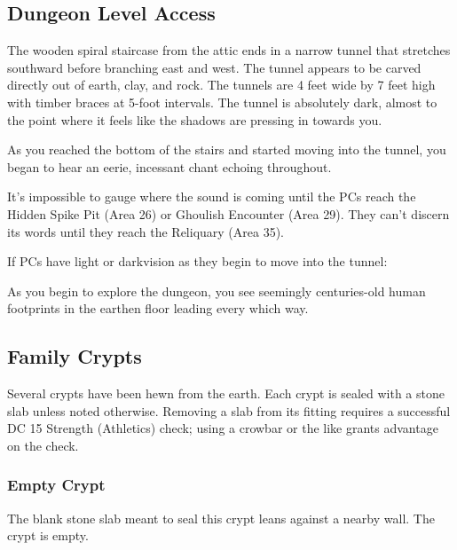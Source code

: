 \pagebreak
\subsection{Dungeon Level Access}
\label{sec:DungeonLevelAccess}
\begin{readout}
  The wooden spiral staircase from the attic ends in a narrow tunnel that stretches southward before branching 
  east and west. The tunnel appears to be carved directly out of earth, clay, and rock. The tunnels are 4 feet 
  wide by 7 feet high with timber braces at 5-foot intervals. The tunnel is absolutely dark, almost to the point 
  where it feels like the shadows are pressing in towards you.
  
  As you reached the bottom of the stairs and started moving into the tunnel, you began to hear an eerie, 
  incessant chant echoing throughout.
\end{readout}
It's impossible to gauge where the sound is coming until the PCs reach the Hidden Spike Pit (Area 26) or Ghoulish
Encounter (Area 29). They can't discern its words until they reach the Reliquary (Area 35).

If PCs have light or darkvision as they begin to move into the tunnel:
\begin{readout}
  As you begin to explore the dungeon, you see seemingly centuries-old human footprints in the earthen floor
  leading every which way.
\end{readout}

\begin{arealinks}
\end{arealinks}


\pagebreak
\subsection{Family Crypts}
\label{sec:FamilyCrypts}
Several crypts have been hewn from the earth. Each crypt is sealed with a stone slab unless noted otherwise.
Removing a slab from its fitting requires a successful DC 15 Strength (Athletics) check; using a crowbar or
the like grants advantage on the check.

\subsubsection{Empty Crypt}
\begin{readout}
  The blank stone slab meant to seal this crypt leans against a nearby wall. The crypt is empty.
\end{readout}


